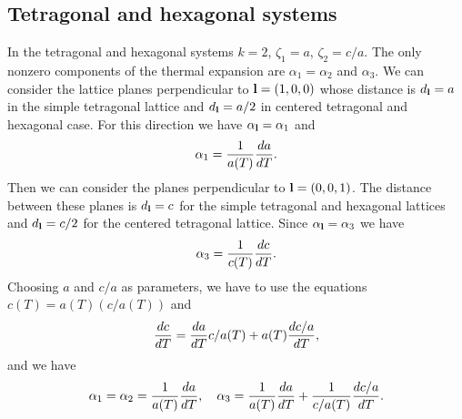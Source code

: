 \documentclass[12pt,a4paper]{article}
\begin{document}
\subsection{\color{web-blue}Tetragonal and hexagonal systems}
In the tetragonal and hexagonal systems $k=2$, $\zeta_1=a$, $\zeta_2=c/a$.
The only nonzero components of the thermal expansion are 
$\alpha_{1}=\alpha_{2}$ and $\alpha_{3}$. We can consider the
lattice planes perpendicular to ${\bf l}=(1,0,0)$ whose distance
is $d_{\bf l}=a$ in the simple tetragonal lattice and $d_{\bf l}=a/2$ in 
centered tetragonal and hexagonal case. 
For this direction we have $\alpha_{\bf l}=\alpha_1$ and 
\begin{equation}
\alpha_1 = {1\over a(T)} {d a \over dT}.
\end{equation}
Then we can consider the planes perpendicular to ${\bf l}=(0,0,1)$.
The distance between these planes is $d_{\bf l}=c$ for the simple
tetragonal and hexagonal lattices and $d_{\bf l}=c/2$ for the 
centered tetragonal lattice. Since $\alpha_{\bf l}=\alpha_3$ we have
\begin{equation}
\alpha_3 = {1\over c(T)} {d c \over dT}. 
\end{equation}
Choosing $a$ and $c/a$ as parameters,
we have to use the equations $c(T)=a(T) (c/a(T))$ and 
\begin{equation}
{dc \over d T} = {da \over d T} c/a(T) + a(T) {d c/a \over dT},
\end{equation}
and we have
\begin{equation}
\alpha_1 = \alpha_2= {1\over a(T)} {d a \over dT}, \ \ \ 
\alpha_3 = {1\over a(T)} {da \over d T}  + {1\over c/a(T)} {d c/a \over dT}.
\end{equation}
\end{document}
